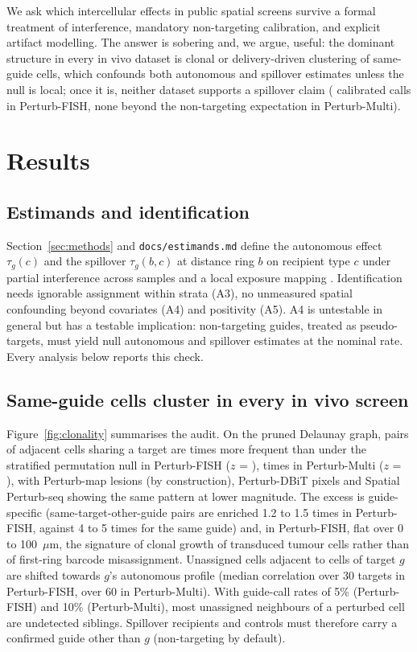 \documentclass[11pt]{article}
\begin{document}
We ask which intercellular effects in public spatial screens survive a formal treatment of
interference, mandatory non-targeting calibration, and explicit artifact modelling. The
answer is sobering and, we argue, useful: the dominant structure in every in vivo dataset is
clonal or delivery-driven clustering of same-guide cells, which confounds both autonomous and
spillover estimates unless the null is local; once it is, neither dataset supports a spillover
claim (\EOneTileSpillHits{} calibrated calls in Perturb-FISH, none beyond the non-targeting
expectation in Perturb-Multi).

\section{Results}
\label{sec:results}

\subsection{Estimands and identification}
Section~\ref{sec:methods} and \texttt{docs/estimands.md} define the autonomous effect
$\tau_g(c)$ and the spillover $\tau_g(b,c)$ at distance ring $b$ on recipient type $c$ under
partial interference across samples \citep{hudgens2008} and a local exposure mapping
\citep{aronow2017}. Identification needs ignorable assignment within strata (A3), no
unmeasured spatial confounding beyond covariates (A4) and positivity (A5). A4 is untestable
in general but has a testable implication: non-targeting guides, treated as pseudo-targets,
must yield null autonomous and spillover estimates at the nominal rate. Every analysis below
reports this check.

\subsection{Same-guide cells cluster in every in vivo screen}
Figure~\ref{fig:clonality} summarises the audit. On the pruned Delaunay graph, pairs of
adjacent cells sharing a target are \FishClonRatio{} times more frequent than under the
stratified permutation null in Perturb-FISH ($z$ = \FishClonZ), \MultiClonRatio{} times in
Perturb-Multi ($z$ = \MultiClonZ), with Perturb-map lesions (by construction), Perturb-DBiT
pixels and Spatial Perturb-seq showing the same pattern at lower magnitude. The excess is
guide-specific (same-target-other-guide pairs are enriched 1.2 to 1.5 times in Perturb-FISH,
against 4 to 5 times for the same guide) and, in Perturb-FISH, flat
over 0 to 100~$\mu$m, the signature of clonal growth of transduced tumour cells rather than of
first-ring barcode misassignment. Unassigned cells adjacent to cells of target $g$ are shifted
towards $g$'s autonomous profile (median correlation \FishMisCor{} over 30 targets in
Perturb-FISH, \MultiMisCor{} over 60 in Perturb-Multi). With guide-call rates of 5\% (Perturb-FISH) and 10\% (Perturb-Multi),
most unassigned neighbours of a perturbed cell are undetected siblings. Spillover recipients
and controls must therefore carry a confirmed guide other than $g$ (non-targeting by default).
\end{document}
